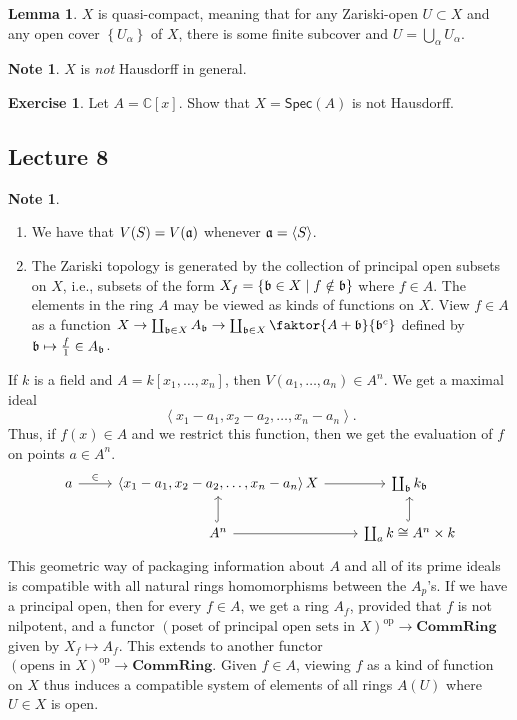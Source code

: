 \documentclass[10pt,letterpaper,cm]{nupset}
\theoremstyle{definition}
\newtheorem{note}[definition]{Note}
\theoremstyle{theorem}
\newtheorem{lemma}[definition]{Lemma}
\newtheorem{exercise}[definition]{Exercise}
\theoremstyle{remark}
\newcommand{\C}{\mathbb C}
\newcommand{\1}{\mathbf{1}}
\newcommand{\0}{\vec 0}
\DeclareMathOperator{\op}{op}
\begin{document}
\begin{lemma}
$X$ is quasi-compact, meaning that for any Zariski-open $U \subset X$ and any open cover $\left\{U_{\alpha}\right\}$ of $X$, there is some finite subcover and $U = \bigcup_{\alpha} U_{\alpha}$. 
\end{lemma}

\begin{note}
$X$ is \emph{not} Hausdorff in general. 
\end{note}
\begin{exercise}
Let $A= \C[x]$. Show that $X = \mathsf{Spec}(A)$ is not Hausdorff. 
\end{exercise}

\subsection{Lecture 8}

\begin{note} $ $
\begin{enumerate}
\item We have that $V(S) = V(\frak{a})$ whenever $\frak{a} = \left\langle S \right\rangle $.
\item The Zariski topology is generated by the collection of principal open subsets on $X$, i.e., subsets of the form $X_f= \left\{\frak{b} \in X \mid  f\notin \frak{b} \right\}$ where $f\in A$. The elements in the ring $A$ may be viewed as kinds of functions on $X$. View $f\in A$ as a function $X \to \coprod_{\frak{b} \in X} A_{\frak{b}} \to \coprod_{\frak{b} \in X} \faktor{A+{\frak{b}}}{\frak{b}^c}$ defined by $\frak{b} \mapsto \frac{f}{1} \in A_{\frak{b}}$.
\end{enumerate}
\end{note}

\medskip

If $k$ is a field and $A = k[x_1, \ldots, x_n]$, then $V(a_1, \ldots, a_n) \in A^n$. We get a maximal ideal $$\left\langle x_1 - a_1, x_2 -a_2, \ldots, x_n-a_n \right\rangle.$$ Thus, if $f(x) \in A$ and we restrict this function, then we get the evaluation of $f$ on points $a\in A^n$.
\[
\begin{tikzcd}
a \arrow[r, "\in"] & {\left\langle x_1 - a_1, x_2 -a_2, \ldots, x_n-a_n \right\rangle X} \arrow[r] & \coprod_{\frak{b}} k_{\frak{b}} \\
 & A^n \arrow[r] \arrow[u, hook] & \coprod_{a} k \cong A^n \times k \arrow[u, hook]
\end{tikzcd}
\] 
This geometric way of packaging information about $A$ and all of its prime ideals is compatible with all natural rings homomorphisms between the $A_p$'s. If we have  a principal open, then for every $f\in A$, we get a ring $A_f$, provided that $f$ is not nilpotent, and a functor $\left(\text{poset of principal open sets in } X\right)^{\op} \to \mathbf{CommRing}$ given by $X_f \mapsto A_f$. This extends to another functor $\left(\text{opens in } X\right)^{\op} \to \mathbf{CommRing}$.  Given $f\in A$, viewing $f$ as a kind of function on $X$ thus induces a compatible system of elements of all rings $A(U)$ where $U\in X$ is open. 
\end{document}
